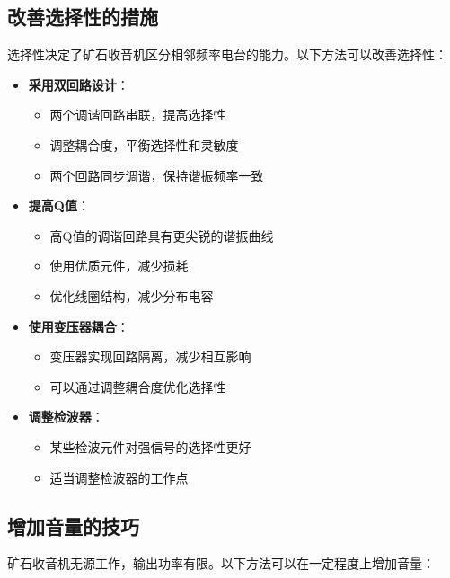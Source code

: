 \documentclass[12pt,UTF8]{ctexbook}
\begin{document}
\subsection{改善选择性的措施}

选择性决定了矿石收音机区分相邻频率电台的能力。以下方法可以改善选择性：

\begin{itemize}[leftmargin=3.5em]
    \item \textbf{采用双回路设计}：
        \begin{itemize}[leftmargin=3.5em]
            \item 两个调谐回路串联，提高选择性
            \item 调整耦合度，平衡选择性和灵敏度
            \item 两个回路同步调谐，保持谐振频率一致
        \end{itemize}
    \item \textbf{提高Q值}：
        \begin{itemize}[leftmargin=3.5em]
            \item 高Q值的调谐回路具有更尖锐的谐振曲线
            \item 使用优质元件，减少损耗
            \item 优化线圈结构，减少分布电容
        \end{itemize}
    \item \textbf{使用变压器耦合}：
        \begin{itemize}[leftmargin=3.5em]
            \item 变压器实现回路隔离，减少相互影响
            \item 可以通过调整耦合度优化选择性
        \end{itemize}
    \item \textbf{调整检波器}：
        \begin{itemize}[leftmargin=3.5em]
            \item 某些检波元件对强信号的选择性更好
            \item 适当调整检波器的工作点
        \end{itemize}
\end{itemize}

\subsection{增加音量的技巧}

矿石收音机无源工作，输出功率有限。以下方法可以在一定程度上增加音量：
\end{document}
